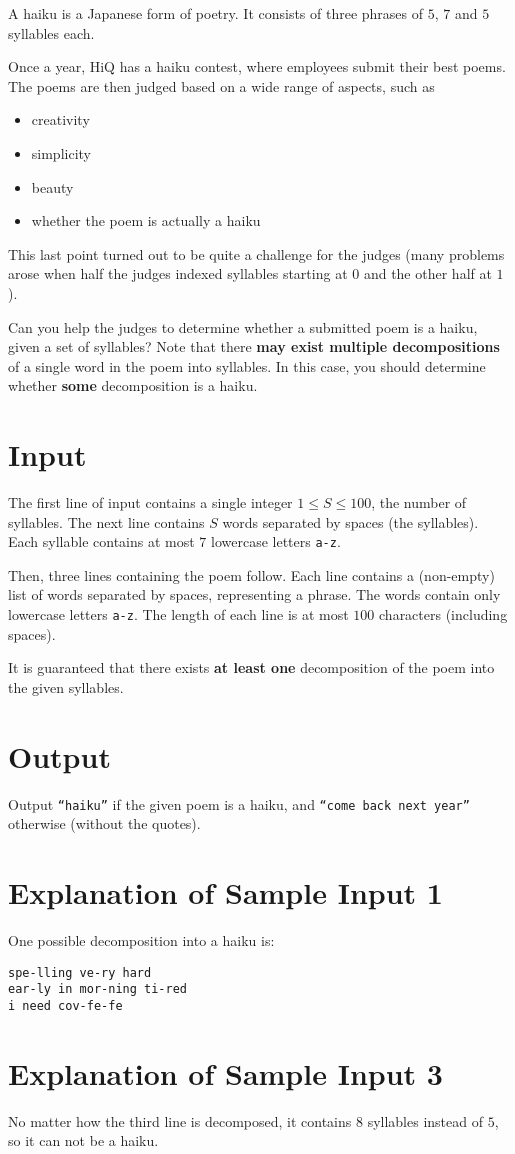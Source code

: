 A haiku is a Japanese form of poetry.
It consists of three phrases of $5$, $7$ and $5$ syllables each.

Once a year, HiQ has a haiku contest, where employees submit their best poems.
The poems are then judged based on a wide range of aspects, such as
\begin{itemize}
    \item creativity
    \item simplicity
    \item beauty
    \item whether the poem is actually a haiku
\end{itemize}
This last point turned out to be quite a challenge for the judges (many problems arose when half the judges indexed syllables starting at $0$ and the other half at $1$).

Can you help the judges to determine whether a submitted poem is a haiku, given a set of syllables?
Note that there \textbf{may exist multiple decompositions} of a single word in the poem into syllables.
In this case, you should determine whether \textbf{some} decomposition is a haiku.

\section*{Input}
The first line of input contains a single integer $1 \le S \le 100$, the number of syllables.
The next line contains $S$ words separated by spaces (the syllables).
Each syllable contains at most $7$ lowercase letters \texttt{a-z}.

Then, three lines containing the poem follow.
Each line contains a (non-empty) list of words separated by spaces, representing a phrase.
The words contain only lowercase letters \texttt{a-z}.
The length of each line is at most $100$ characters (including spaces).

It is guaranteed that there exists \textbf{at least one} decomposition of the poem into the given syllables.

\section*{Output}
Output \texttt{``haiku''} if the given poem is a haiku, and \texttt{``come back next year''} otherwise (without the quotes).

\section*{Explanation of Sample Input 1}
One possible decomposition into a haiku is:
\begin{verbatim}
spe-lling ve-ry hard
ear-ly in mor-ning ti-red
i need cov-fe-fe
\end{verbatim}

\section*{Explanation of Sample Input 3}
No matter how the third line is decomposed, it contains $8$ syllables instead of $5$, so it can not be a haiku.
